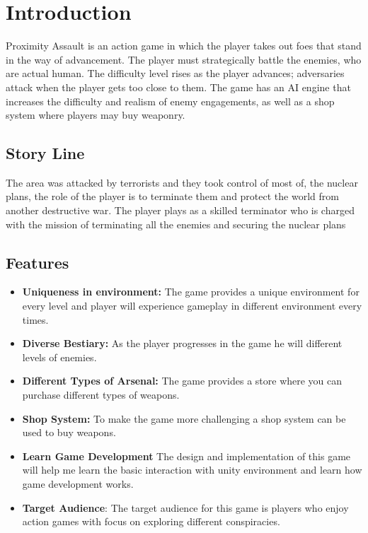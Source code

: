 
\chapter{Introduction}
Proximity Assault is an action game in which the player takes out foes that stand in the way of advancement. The player must strategically battle the enemies, who are actual human. The difficulty level rises as the player advances; adversaries attack when the player gets too close to them. The game has an AI engine that increases the difficulty and realism of enemy engagements, as well as a shop system where players may buy weaponry.
\section{Story Line}
The area was attacked by terrorists and they took control of most of, the nuclear plans, the role of the player is to terminate them and protect the world from another destructive war. The player plays as a skilled terminator who is charged with the mission of terminating all the enemies and securing the nuclear plans
\section{Features}
\begin{itemize}
	\item \textbf{Uniqueness in environment:} The game provides a unique environment for every level and player will experience gameplay in different environment every times.
	\item \textbf{Diverse Bestiary:} As the player progresses in the game he will different levels of enemies.
	
	\item \textbf{Different Types of Arsenal:} The game provides a store where you can purchase different types of weapons.
	
	\item \textbf{Shop System:} To make the game more challenging a shop system can be used to buy weapons. 

	\item \textbf{Learn Game Development} The design and implementation of this game will help me learn the basic interaction with unity environment and learn how game development works.
	\item \textbf{Target Audience}: The target audience for this game is players who enjoy action games with focus on exploring different conspiracies.
\end{itemize}

